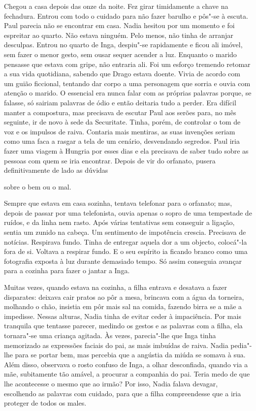 Chegou a casa depois das onze da noite. Fez girar timidamente a chave
na fechadura. Entrou com todo o cuidado para não fazer barulho e pôs"-se
à escuta. Paul parecia não se encontrar em casa. Nadia hesitou por um
momento e foi espreitar ao quarto. Não estava ninguém. Pelo menos, não
tinha de arranjar desculpas. Entrou no quarto de Inga, despiu"-se
rapidamente e ficou ali imóvel, sem fazer o menor gesto, sem ousar
sequer acender a luz. Enquanto o marido pensasse que estava com gripe,
não entraria ali. Foi um esforço tremendo retomar a sua vida quotidiana, sabendo que Drago estava doente. Vivia de acordo com um guião
ficcional, tentando dar corpo a uma personagem que sorria e ouvia com
atenção o marido. O essencial era nunca falar com as próprias palavras
porque, se falasse, só sairiam palavras de ódio e então deitaria tudo a
perder. Era difícil manter a compostura, mas precisava de escutar Paul
aos serões para, no mês seguinte, ir de novo à sede da Securitate.
Tinha, porém, de controlar o tom de voz e os impulsos de raiva. Contaria
mais mentiras, as suas invenções seriam como uma faca a rasgar a tela de
um cenário, desvendando segredos. Paul iria fazer uma viagem à Hungria
por esses dias e ela precisava de saber tudo sobre as pessoas com quem
se iria encontrar. Depois de vir do orfanato, pusera definitivamente de
lado as dúvidas

sobre o bem ou o mal.

Sempre que estava em casa sozinha, tentava telefonar para o orfanato;
mas, depois de passar por uma telefonista, ouvia apenas o sopro de uma
tempestade de ruídos, e da linha nem rasto. Após várias tentativas sem
conseguir
a ligação, sentia um zunido na cabeça. Um sentimento de impotência
crescia. Precisava de notícias. Respirava fundo. Tinha de entregar
aquela dor a um objecto, colocá"-la fora de si. Voltava a respirar fundo.
E o seu espírito ia ficando branco como uma fotografia exposta à luz
durante demasiado tempo. Só assim conseguia avançar para a cozinha
para fazer o jantar a Inga.

Muitas vezes, quando estava na cozinha, a filha entrava e desatava a
fazer disparates: deixava cair pratos ao pôr a mesa, brincava com a água
da torneira, molhando o chão, insistia em pôr mais sal na comida,
fazendo birra se a mãe a impedisse. Nessas alturas, Nadia tinha de
evitar ceder à impaciência. Por mais tranquila que tentasse parecer,
medindo os gestos e as palavras com a filha, ela tornara"-se uma criança
agitada. Às vezes, parecia"-lhe que Inga tinha memorizado as expressões
faciais do pai, as mais imbuídas de raiva. Nadia pedia"-lhe para se
portar bem, mas percebia que a angústia da miúda se somava à sua. Além
disso, observava o rosto confuso de Inga, a olhar desconfiada, quando
via a mãe, subitamente tão amável, a procurar a companhia do pai. Teria
medo de que lhe acontecesse o mesmo que ao irmão? Por isso, Nadia falava
devagar, escolhendo as palavras com cuidado, para que a filha
compreendesse que a iria proteger de todos os males.

